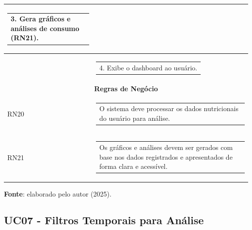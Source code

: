 \begin{longtable}[c]{|p{}|p{}|}
  \begin{tabular}[c]{@{}p{}@{}}3. Gera gráficos e análises de consumo (RN21).\end{tabular} \\ \hline
\multicolumn{1}{|p{0.48\textwidth}|}{} &
  \begin{tabular}[c]{@{}p{}@{}}4. Exibe o dashboard ao usuário.\end{tabular} \\ \hline
\multicolumn{2}{|c|}{\textbf{Regras de Negócio}} \\ \hline
\multicolumn{1}{|p{0.48\textwidth}|}{RN20} &
  \begin{tabular}[c]{@{}p{}@{}}O sistema deve processar os dados nutricionais do usuário para análise.\end{tabular} \\ \hline
\multicolumn{1}{|p{0.48\textwidth}|}{RN21} &
  \begin{tabular}[c]{@{}p{}@{}}Os gráficos e análises devem ser gerados com base nos dados registrados e apresentados de forma clara e acessível.\end{tabular} \\ \hline
\end{longtable}
\begin{center}
    \small{\textbf{Fonte}: elaborado pelo autor (2025).}
\end{center}


\subsection{UC07 - Filtros Temporais para Análise}

